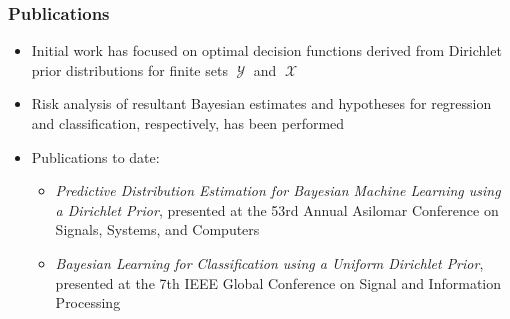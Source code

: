 \documentclass[aspectratio=169,usenames,dvipsnames]{beamer}
\DeclareMathOperator{\Xcal}{\mathcal{X}}
\DeclareMathOperator{\Ycal}{\mathcal{Y}}
\begin{document}
\begin{frame} 
\frametitle{Publications}

\begin{itemize}
\item Initial work has focused on optimal decision functions derived from Dirichlet prior distributions for finite sets $\Ycal$ and $\Xcal$
\vspace{0.5em}
\item Risk analysis of resultant Bayesian estimates and hypotheses for regression and classification, respectively, has been performed
\vspace{0.5em}
\item \alert{Publications to date}:
	\vspace{0.25em}
	\begin{itemize}
	\item \emph{Predictive Distribution Estimation for Bayesian Machine Learning using a Dirichlet Prior}, presented at 	the 53rd Annual Asilomar Conference on Signals, Systems, and Computers
	\vspace{0.25em}
	\item \emph{Bayesian Learning for Classification using a Uniform Dirichlet Prior}, presented at the 7th IEEE Global Conference on Signal and Information Processing
	\end{itemize}
\end{itemize}

\end{frame}
\end{document}
